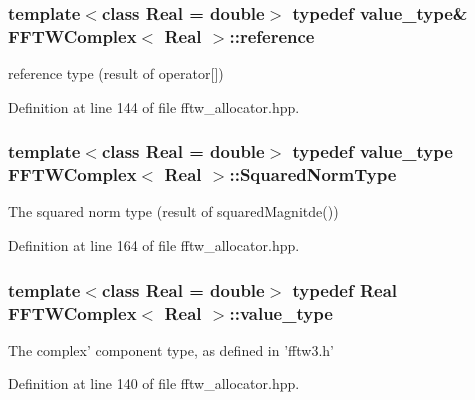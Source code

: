 \hypertarget{class_f_f_t_w_complex_a7dfe1fb0319193094de12aef4000957d}{
\subsubsection[{reference}]{\setlength{\rightskip}{0pt plus 5cm}template$<$class Real = double$>$ typedef {\bf value\-\_\-type}\& {\bf F\-F\-T\-W\-Complex}$<$ Real $>$\-::{\bf reference}}}\label{class_f_f_t_w_complex_a7dfe1fb0319193094de12aef4000957d}
reference type (result of operator\mbox{[}\mbox{]}) 

Definition at line 144 of file fftw\-\_\-allocator.\-hpp.

\hypertarget{class_f_f_t_w_complex_a048e30a91c9d932442272164d8a8db40}{
\subsubsection[{Squared\-Norm\-Type}]{\setlength{\rightskip}{0pt plus 5cm}template$<$class Real = double$>$ typedef {\bf value\-\_\-type} {\bf F\-F\-T\-W\-Complex}$<$ Real $>$\-::{\bf Squared\-Norm\-Type}}}\label{class_f_f_t_w_complex_a048e30a91c9d932442272164d8a8db40}
The squared norm type (result of squared\-Magnitde()) 

Definition at line 164 of file fftw\-\_\-allocator.\-hpp.

\hypertarget{class_f_f_t_w_complex_af159fb8086896f4f62494d72ce0f9d38}{
\subsubsection[{value\-\_\-type}]{\setlength{\rightskip}{0pt plus 5cm}template$<$class Real = double$>$ typedef Real {\bf F\-F\-T\-W\-Complex}$<$ Real $>$\-::{\bf value\-\_\-type}}}\label{class_f_f_t_w_complex_af159fb8086896f4f62494d72ce0f9d38}
The complex' component type, as defined in '{\ttfamily fftw3.\-h}' 

Definition at line 140 of file fftw\-\_\-allocator.\-hpp.



